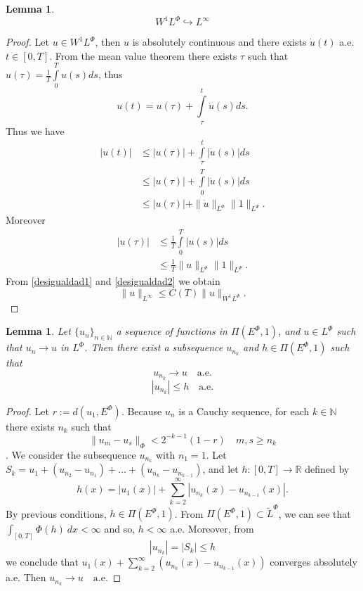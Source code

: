 \documentclass[twoside]{article}
\newtheorem{lem}[thm]{Lemma}
\newcommand{\lphi}{L^{\Phi}}
\newcommand{\ephi}{E^{\Phi}}
\newcommand{\claseor}{\widetilde{L}^{\Phi}}
\newcommand{\wphi}{W^{1}\lphi}
\begin{document}
\begin{lem}\label{inclusion orlicz}
\[\wphi\hookrightarrow L^{\infty}\]
\end{lem}
\begin{proof}
Let $u\in \wphi$, then $u$ is absolutely continuous and there exists $\dot{u}(t)$ a.e. $t\in[0,T]$. From the mean value theorem there exists $\tau$ such that
$u(\tau)=\frac{1}{T}\int\limits_{0}^{T}u(s)ds$, thus
\[
u(t)=u(\tau)+\int\limits_{\tau}^{t}\dot{u}(s)ds.
\]
Thus we have
\begin{equation}\label{desigualdad1}\begin{split}
|u(t)|&\leqslant |u(\tau)|+\int\limits_{\tau}^{t}|\dot{u}(s)|ds\\
&\leqslant |u(\tau)|+\int\limits_{0}^{T}|\dot{u}(s)|ds\\
&\leqslant |u(\tau)|+\|\dot{u}\|_{L^{\Phi}}\|1\|_{L^{\Psi}}.
\end{split}
\end{equation}
Moreover
\begin{equation}\label{desigualdad2}\begin{split}
|u(\tau)|&\leqslant \frac{1}{T}\int\limits_{0}^{T}|u(s)|ds\\
&\leqslant \frac{1}{T}\|u\|_{L^{\Phi}}\|1\|_{L^{\Psi}}.
\end{split}
\end{equation}
From \eqref{desigualdad1} and \eqref{desigualdad2} we obtain
\[
\|u\|_{L^{\infty}}\leqslant C(T)\|u\|_{\wphi}.
\]

\end{proof}

\begin{lem}\label{segundo lema}
Let $\{u_n\}_{n\in \mathbb{N}}$ a sequence of  functions in $\Pi(\ephi,1)$, and $u\in \lphi$ such that $u_n\rightarrow u$ in $\lphi$. Then there exist a subsequence
$u_{n_k}$ and {\color{red}$h\in\Pi(\ephi,1)$} such that
\[u_{n_k}\rightarrow u \quad\text{a.e.}\]
\[|u_{n_k}|\leq h\quad\text{a.e.}\]
\end{lem}
\begin{proof}
Let $r:=d(u_1,\ephi)$. Because $u_n$ is a Cauchy sequence, for
each $k\in\mathbb{N}$ there exists $n_k$ such that
\[\|u_m-u_s\|_{\Phi}<2^{-k-1}(1-r)\quad m,s\geq n_k\].
We consider the subsequence $u_{n_k}$ with $n_1=1$. Let
$S_k=u_1+(u_{n_2}-u_{n_1})+\ldots+(u_{n_k}-u_{n_{k-1}})$, and let
$h:[0,T]\rightarrow\mathbb{R}$ defined by
\[ h(x)=|u_1(x)|+\sum_{k=2}^{\infty}|u_{n_k}(x)-u_{n_{k-1}}(x)|.\]
By previous conditions, $h\in\Pi(\ephi,1)$. From
$\Pi(\ephi,1)\subset \claseor$, we can see that $\int_{[0,T]}
\Phi(h)\ dx < \infty$ and so, $h<\infty$ a.e. Moreover, from \[
|u_{n_k}|=|S_k|\leq h\]we conclude that
$u_1(x)+\sum_{k=2}^{\infty}(u_{n_k}(x)-u_{n_{k-1}}(x))$ converges
absolutely a.e. Then $u_{n_k}\rightarrow u \quad\text{a.e.}$
\end{proof}
\end{document}
